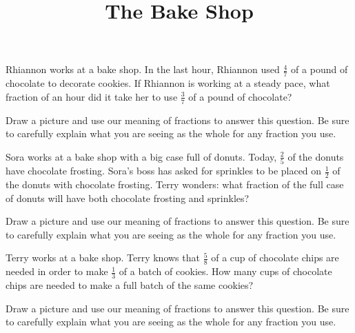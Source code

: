 \documentclass[nooutcomes,noauthor]{ximera}
\title{The Bake Shop}
\begin{document}
\begin{abstract}
\end{abstract}

\maketitle

\begin{problem}
Rhiannon works at a bake shop. In the last hour, Rhiannon used $\frac{4}{7}$ of a pound of chocolate to decorate cookies. If Rhiannon is working at a steady pace, what fraction of an hour did it take her to use $\frac{3}{7}$ of a pound of chocolate?

Draw a picture and use our meaning of fractions to answer this question. Be sure to carefully explain what you are seeing as the whole for any fraction you use.
\end{problem}

\begin{problem}
Sora works at a bake shop with a big case full of donuts. Today, $\frac{2}{5}$ of the donuts have chocolate frosting. Sora's boss has asked for sprinkles to be placed on $\frac{1}{2}$ of the donuts with chocolate frosting. Terry wonders: what fraction of the full case of donuts will have both chocolate frosting and sprinkles?

Draw a picture and use our meaning of fractions to answer this question. Be sure to carefully explain what you are seeing as the whole for any fraction you use.
\end{problem}


\begin{problem}
Terry works at a bake shop. Terry knows that $\frac{5}{8}$ of a cup of chocolate chips are needed  in order to make $\frac{1}{3}$ of a batch of cookies. How many cups of chocolate chips are needed to make a full batch of the same cookies?

Draw a picture and use our meaning of fractions to answer this question. Be sure to carefully explain what you are seeing as the whole for any fraction you use.
\end{problem}





\newpage
\end{document}
